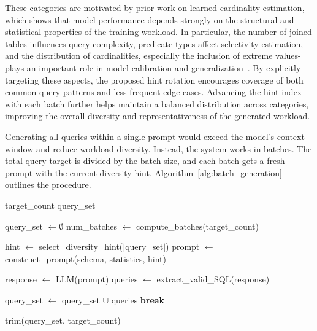 These categories are motivated by prior work on learned cardinality estimation, which shows that model performance depends strongly on the structural and statistical properties of the training workload. In particular, the number of joined tables influences query complexity, predicate types affect selectivity estimation, and the distribution of cardinalities, especially the inclusion of extreme values-plays an important role in model calibration and generalization~\cite{DBLP:conf/cidr/KipfKRLBK19}. By explicitly targeting these aspects, the proposed hint rotation encourages coverage of both common query patterns and less frequent edge cases. Advancing the hint index with each batch further helps maintain a balanced distribution across categories, improving the overall diversity and representativeness of the generated workload.

Generating all queries within a single prompt would exceed the model's context window and reduce workload diversity. Instead, the system works in batches. The total query target is divided by the batch size, and each batch gets a fresh prompt with the current diversity hint. Algorithm~\ref{alg:batch_generation} outlines the procedure.

\begin{algorithm}[tb]
\caption{LLM-Based Query Generation}
\label{alg:batch_generation}
\begin{algorithmic}[1]
\Require target\_count
\Ensure query\_set

\State query\_set $\gets \emptyset$
\State num\_batches $\gets$ compute\_batches(target\_count)

    \State hint $\gets$ select\_diversity\_hint($|$query\_set$|$)
    \State prompt $\gets$ construct\_prompt(schema, statistics, hint)

        \State response $\gets$ LLM(prompt)
        \State queries $\gets$ extract\_valid\_SQL(response)
        
            \State query\_set $\gets$ query\_set $\cup$ queries
            \State \textbf{break}
        \EndIf
    \EndFor
\EndFor

\State \Return trim(query\_set, target\_count)
\end{algorithmic}
\end{algorithm}


